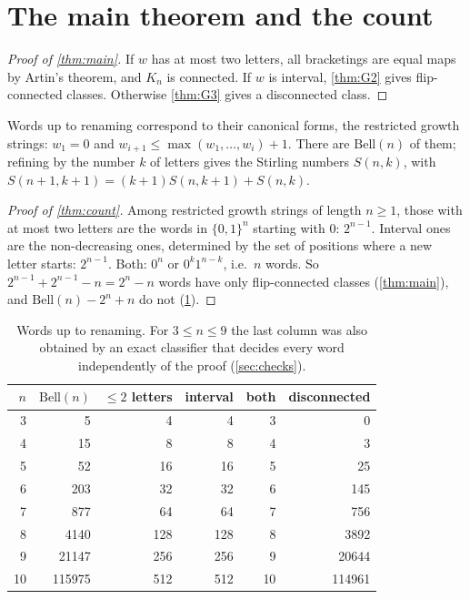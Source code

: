 \documentclass[11pt,a4paper]{article}
\theoremstyle{definition}
\theoremstyle{remark}
\newcommand{\Bell}{\mathrm{Bell}}
\begin{document}
\section{The main theorem and the count}\label{sec:main}

\begin{proof}[Proof of \cref{thm:main}]
If $w$ has at most two letters, all bracketings are equal maps by Artin's theorem, and $K_n$ is
connected. If $w$ is interval, \cref{thm:G2} gives flip-connected classes. Otherwise \cref{thm:G3} gives
a disconnected class.
\end{proof}

Words up to renaming correspond to their canonical forms, the restricted growth strings: $w_1=0$ and
$w_{i+1}\le\max(w_1,\dots,w_i)+1$. There are $\Bell(n)$ of them; refining by the number $k$ of letters
gives the Stirling numbers $S(n,k)$, with $S(n+1,k+1)=(k+1)S(n,k+1)+S(n,k)$.

\begin{proof}[Proof of \cref{thm:count}]
Among restricted growth strings of length $n\ge1$, those with at most two letters are the words in
$\{0,1\}^n$ starting with $0$: $2^{n-1}$. Interval ones are the non-decreasing ones, determined by the
set of positions where a new letter starts: $2^{n-1}$. Both: $0^n$ or $0^k1^{n-k}$, i.e.\ $n$ words. So
$2^{n-1}+2^{n-1}-n=2^n-n$ words have only flip-connected classes (\cref{thm:main}), and
$\Bell(n)-2^n+n$ do not (\cref{tab:counts}).
\end{proof}

\begin{table}[h]
\centering
\small
\begin{tabular}{rrrrrr}
\toprule
$n$ & $\Bell(n)$ & $\le2$ letters & interval & both & disconnected \\
\midrule
3 & 5 & 4 & 4 & 3 & 0 \\
4 & 15 & 8 & 8 & 4 & 3 \\
5 & 52 & 16 & 16 & 5 & 25 \\
6 & 203 & 32 & 32 & 6 & 145 \\
7 & 877 & 64 & 64 & 7 & 756 \\
8 & 4140 & 128 & 128 & 8 & 3892 \\
9 & 21147 & 256 & 256 & 9 & 20644 \\
10 & 115975 & 512 & 512 & 10 & 114961 \\
\bottomrule
\end{tabular}
\caption{Words up to renaming. For $3\le n\le9$ the last column was also obtained by an exact
classifier that decides every word independently of the proof (\cref{sec:checks}).}
\label{tab:counts}
\end{table}
\end{document}
